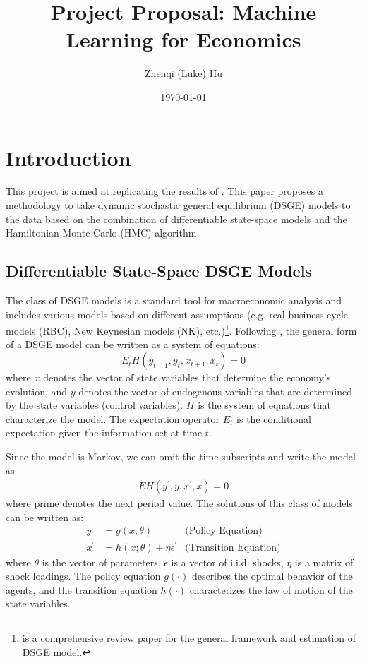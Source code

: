 \documentclass[12pt]{article}
\title{Project Proposal: Machine Learning for Economics}
\author{Zhenqi (Luke) Hu}
\date{\today}
\begin{document}
\maketitle

\section{Introduction}
This project is aimed at replicating the results of \citet{childersDifferentiableStateSpaceModels2022}. This paper proposes a methodology to take dynamic stochastic general equilibrium (DSGE) models to the data based on the combination of differentiable state-space models and the Hamiltonian Monte Carlo (HMC) algorithm. 

\subsection*{Differentiable State-Space DSGE Models}
The class of DSGE models is a standard tool for macroeconomic analysis and includes various models based on different assumptions (e.g. real business cycle models (RBC), New Keynesian models (NK), etc.)\footnote{\citet{fernandez-villaverdeEstimatingDSGEModels2021} is a comprehensive review paper for the general framework and estimation of DSGE model.}. Following \citet{schmitt-groheSolvingDynamicGeneral2004}, the general form of a DSGE model can be written as a system of equations:
$$
E_t H(y_{t+1}, y_t, x_{t+1}, x_t) = 0
$$
where $x$ denotes the vector of state variables that determine the economy's evolution, and $y$ denotes the vector of endogenous variables that are determined by the state variables (control variables). $H$ is the system of equations that characterize the model. The expectation operator $E_t$ is the conditional expectation given the information set at time $t$.

Since the model is Markov, we can omit the time subscripts and write the model as:
$$
\begin{aligned}
    E H(y^{\prime}, y, x^{\prime}, x) = 0
\end{aligned}
$$
where prime denotes the next period value. The solutions of this class of models can be written as:
$$
\begin{aligned}
y &= g(x;\theta)  &\text{(Policy Equation)}\\
x^{\prime} &= h(x;\theta) + \eta\epsilon^{\prime} &\text{(Transition Equation)}
\end{aligned}
$$
where $\theta$ is the vector of parameters, $\epsilon$ is a vector of i.i.d. shocks, $\eta$ is a matrix of shock loadings. The policy equation $g(\cdot)$ describes the optimal behavior of the agents, and the transition equation $h(\cdot)$ characterizes the law of motion of the state variables.
\end{document}
